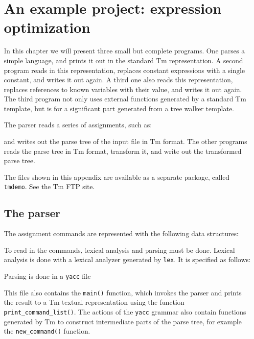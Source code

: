 \chapter{An example project: expression optimization}
\label{s.calc}
In this chapter we will present three small but complete programs.
One parses a simple language, and prints it out in the standard Tm
representation. A second program reads in this representation, replaces
constant expressions with a single constant, and writes it out again.
A third one also reads this representation, replaces references to
known variables with their value, and writes it out again.
The third program not only uses external functions generated by a
standard Tm template, but is for a significant part generated from
a tree walker template.

The parser reads a series of assignments, such as:
\begin{showfile}
\end{showfile}
and writes out the parse tree of the input file in Tm format.
The other programs reads the parse tree in Tm format, transform it,
and write out the transformed parse tree.

The files shown in this appendix are available as a separate package,
called \verb'tmdemo'. See the Tm FTP site.

\section{The parser}
\label{s.calcparser}
The assignment commands are represented with the following data structures:
\begin{showfile}
\end{showfile}

To read in the commands, lexical analysis and parsing must be done.
Lexical analysis is done with a lexical analyzer generated by
\texttt{lex}. It is specified as follows:
\begin{showfile}
\end{showfile}

Parsing is done in a \texttt{yacc} file
\begin{showfile}
\end{showfile}

This file also contains the \verb'main()' function, which invokes the
parser and prints the result to a Tm textual representation using the
function \verb'print_command_list()'. The actions of the \texttt{yacc}
grammar also contain functions generated by Tm to construct intermediate 
parts of the parse tree, for example the \verb'new_command()' function.


